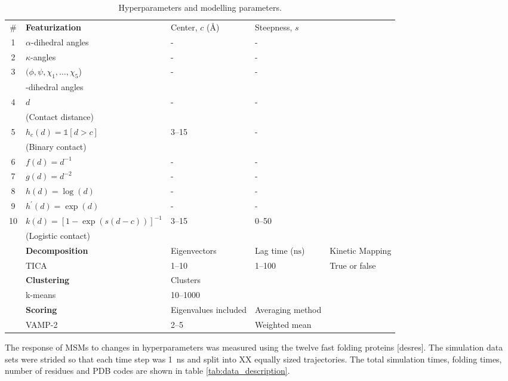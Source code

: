 \documentclass{article}
\begin{document}
\begin{table}[]
    \centering
    \caption{Hyperparameters and modelling parameters. }
    \begin{tabularx}{\textwidth}{clXXX}
    \toprule
    \# & \textbf{Featurization} & Center, $c$ (\si{\angstrom}) & Steepness, $s$ &  \\ 
    1 & $\alpha$-dihedral angles & - & - & \\
    2 & $\kappa$-angles & - & - & \\ 
    3 & $(\phi, \psi, \chi_{1}, \ldots, \chi_{5}$) & - & - & \\ 
     & -dihedral angles & & & \\
    4 & $d$  & - & - & \\
     & (Contact distance)  & & & \\
    5 & $h_{c}(d) = \mathbb{1}[d>c]$ &  \numrange{3}{15} & - & \\
     & (Binary contact) & & & \\
    6 & $f(d) = d^{-1}$  & - & - & \\
    7 & $g(d) = d^{-2}$  & - & - & \\
    8 & $h(d) = \log{(d)}$   & - & - & \\
    9 & $h^{\prime}(d) = \exp{(d)}$  & - & - & \\
    10 & $k(d) = [1-\exp{(s(d-c))}]^{-1}$  &  \numrange{3}{15} & \numrange{0}{50} & \\
    & (Logistic contact) & & & \\
    \midrule
    & \textbf{Decomposition} & Eigenvectors & Lag time ($\si{\nano\second}$) & Kinetic Mapping \\ 
    & TICA & \numrange{1}{10} & \numrange{1}{100} & True or false \\
    \midrule
    & \textbf{Clustering} & Clusters & & \\
    & k-means & \numrange{10}{1000} & & \\
    \midrule
    & \textbf{Scoring} & Eigenvalues included & Averaging method & \\
    & VAMP-2 & \numrange{2}{5} & Weighted mean & \\
    \bottomrule
    \end{tabularx}
    \label{tab:search_space}
\end{table}

The response of MSMs to changes in hyperparameters was measured using the twelve fast folding proteins [desres].  The simulation data sets  were strided so that each time step was \SI{1}{\nano\second} and split into XX equally sized trajectories. The total simulation times, folding times, number of residues and PDB codes are shown in table \ref{tab:data_description}. 
\end{document}
